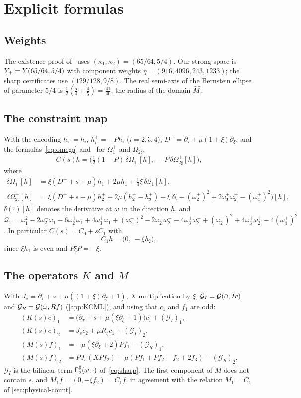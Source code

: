 \section{Explicit formulas}\label{app:formulas}

\subsection{Weights}
The existence proof of~\cite{RT2019} uses $(\kappa_1,\kappa_2)=(65/64,5/4)$. Our strong space is $Y_{+}=Y(65/64,5/4)$
with component weights $\eta=(916,4096,243,1233)$; the sharp certificates use $(129/128,9/8)$. The real semi-axis
of the Bernstein ellipse of parameter $5/4$ is $\tfrac12(\tfrac54+\tfrac45)=\tfrac{41}{40}$, the radius of the
domain $\widehat M$.

\subsection{The constraint map}
With the encoding $h_i^-=h_i$, $h_i^+=-Ph_i$ ($i=2,3,4$), $D^+=\partial_\tau+\mu(1+\xi)\partial_\xi$, and the
formulas~\eqref{eq:omega} and~\cite[\S2]{RT2019} for $\Omega_1^+$ and $\Omega_{2\sharp}^+$,
\[
  C(s)h=\Big(\tfrac12(1-P)\,\delta\Omega_1^+[h],\ -P\,\delta\Omega_{2\sharp}^+[h]\Big),
\]
where
\begin{align*}
  \delta\Omega_1^+[h]&=\xi(D^++s+\mu)h_1+2\mu h_1+\tfrac14\xi\,\delta\mathcal Q_1[h],\\
  \delta\Omega_{2\sharp}^+[h]&=\xi(D^++s+\mu)h_2^++2\mu(h_2^+-h_3^+)
    +\xi\,\delta\big(-(\omega_2^+)^2+2\omega_3^+\omega_2^+-(\omega_4^+)^2\big)[h],
\end{align*}
$\delta(\cdot)[h]$ denotes the derivative at $\bar\omega$ in the direction $h$, and
$\mathcal Q_1=\omega_1^2-2\omega_2^-\omega_1-6\omega_2^+\omega_1+4\omega_3^+\omega_1+(\omega_2^-)^2-2\omega_2^+\omega_2^-
-4\omega_3^+\omega_2^-+(\omega_2^+)^2+4\omega_3^+\omega_2^+-4(\omega_4^+)^2$. In particular $C(s)=C_0+sC_1$ with
\[
  C_1h=\big(0,\ -\xi h_2\big),
\]
since $\xi h_1$ is even and $P\xi P=-\xi$.

\subsection{The operators $K$ and $M$}
With $J_s=\partial_\tau+s+\mu((1+\xi)\partial_\xi+1)$, $X$ multiplication by $\xi$,
$\mathcal G_I=\mathcal G(\bar\omega,Ic)$ and $\mathcal G_R=\mathcal G(\bar\omega,Rf)$ (\cref{app:KCML}), and using that
$c_1$ and $f_1$ are odd:
\begin{align*}
  (K(s)c)_1&=\big(\partial_\tau+s+\mu(\xi\partial_\xi+1)\big)c_1+(\mathcal G_I)_1,\\
  (K(s)c)_2&=J_sc_2+\mu R_\xi c_1+(\mathcal G_I)_2,\\
  (M(s)f)_1&=-\mu(\xi\partial_\xi+2)Pf_1-(\mathcal G_R)_1,\\
  (M(s)f)_2&=PJ_s(XPf_2)-\mu(Pf_1+Pf_2-f_2+2f_3)-(\mathcal G_R)_2 .
\end{align*}
$\mathcal G_I$ is the bilinear term $\Gamma_2^\sharp(\bar\omega,\cdot)$ of~\eqref{eq:sharp}. The first component of $M$ does
not contain $s$, and $M_1f=(0,-\xi f_2)=C_1f$, in agreement with the relation $M_1=C_1$ of \cref{sec:physical-count}.
